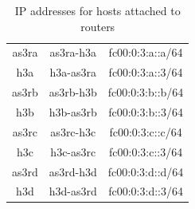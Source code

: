 \begin{table}[h!]
\begin{tabular}{|c|c|c|}
as3ra & as3ra-h3a & fc00:0:3:a::a/64 \\
h3a & h3a-as3ra & fc00:0:3:a::3/64 \\

as3rb & as3rb-h3b & fc00:0:3:b::b/64 \\
h3b & h3b-as3rb & fc00:0:3:b::3/64 \\

as3rc & as3rc-h3c & fc00:0:3:c::c/64 \\
h3c & h3c-as3rc & fc00:0:3:c::3/64 \\

as3rd & as3rd-h3d & fc00:0:3:d::d/64 \\
h3d & h3d-as3rd & fc00:0:3:d::3/64 \\
\hline
\end{tabular}
\caption{IP addresses for hosts attached to routers}
\label{table:gbp_interfaces}
\end{table}
